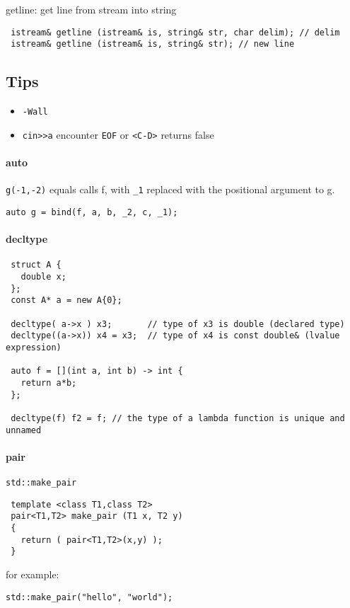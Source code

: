 getline: get line from stream into string
\begin{lstlisting}
 istream& getline (istream& is, string& str, char delim); // delim
 istream& getline (istream& is, string& str); // new line
\end{lstlisting}



\subsection{Tips}
\begin{itemize}
\item \texttt{-Wall}
\item \verb$cin>>a$ encounter \verb$EOF$ or \verb$<C-D>$ returns false
\end{itemize}

\paragraph{auto}
\texttt{g(-1,-2)} equals calls f, with \verb$_1$ replaced with
the positional argument to g.
\begin{lstlisting}
auto g = bind(f, a, b, _2, c, _1);
\end{lstlisting}

\paragraph{decltype}
\begin{lstlisting}
 struct A {
   double x;
 };
 const A* a = new A{0};

 decltype( a->x ) x3;       // type of x3 is double (declared type)
 decltype((a->x)) x4 = x3;  // type of x4 is const double& (lvalue expression)

 auto f = [](int a, int b) -> int {
   return a*b;
 };

 decltype(f) f2 = f; // the type of a lambda function is unique and unnamed
\end{lstlisting}

\paragraph{pair}
\verb$std::make_pair$
\begin{lstlisting}
 template <class T1,class T2>
 pair<T1,T2> make_pair (T1 x, T2 y)
 {
   return ( pair<T1,T2>(x,y) );
 }
\end{lstlisting}
for example:

\begin{lstlisting}
std::make_pair("hello", "world");
\end{lstlisting}

